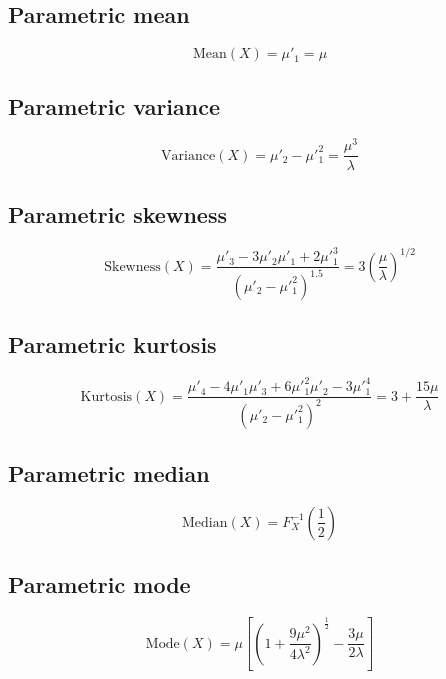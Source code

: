 \documentclass{article}
\begin{document}
\subsection{Parametric mean}
\begin{equation*} \mathrm{Mean}(X)=\mu'_{1}=\mu \end{equation*}
\subsection{Parametric variance}
\begin{equation*} \mathrm{Variance}(X)=\mu'_{2}-\mu'^{2}_{1}=\frac{\mu^3}{\lambda} \end{equation*}
\subsection{Parametric skewness}
\begin{equation*} \mathrm{Skewness}(X)=\frac{\mu'_{3}-3\mu'_{2}\mu'_{1}+2\mu'^{3}_{1}}{(\mu'_{2}-\mu'^{2}_{1})^{1.5}}=3\left(\frac{\mu}{\lambda}\right)^{1/2} \end{equation*}
\subsection{Parametric kurtosis}
\begin{equation*} \mathrm{Kurtosis}(X)=\frac{\mu'_{4}-4\mu'_{1}\mu'_{3}+6\mu'^{2}_{1}\mu'_{2}-3\mu'^{4}_{1}}{(\mu'_{2}-\mu'^{2}_{1})^{2}}=3+\frac{15 \mu}{\lambda} \end{equation*}
\subsection{Parametric median}
\begin{equation*} \mathrm{Median}(X)=F^{-1}_{X}\left(\frac{1}{2}\right) \end{equation*}
\subsection{Parametric mode}
\begin{equation*} \mathrm{Mode}(X)=\mu\left[\left(1+\frac{9 \mu^2}{4 \lambda^2}\right)^\frac{1}{2}-\frac{3 \mu}{2 \lambda}\right] \end{equation*}
\end{document}
